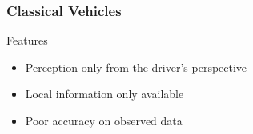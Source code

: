 
\begin{frame}
\frametitle{Classical Vehicles}
    \begin{center}
        \resizebox{0.9\linewidth}{!}{%
            
        }
        \begin{exampleblock}{Features}
            \begin{itemize}
                \item Perception only from the driver's perspective
                \item Local information only available 
                \item Poor accuracy on observed data
            \end{itemize}
        \end{exampleblock}
    \end{center}
\end{frame}